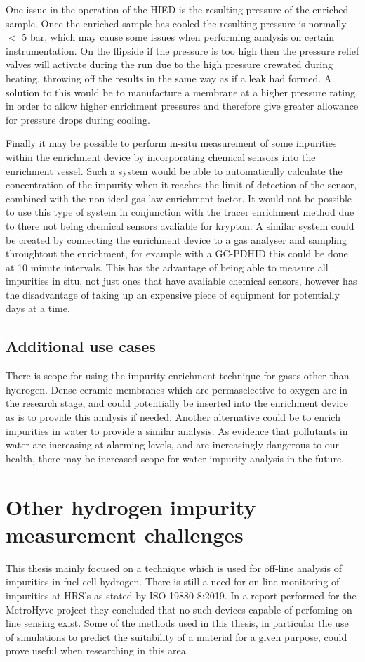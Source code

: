 One issue in the operation of the HIED is the resulting pressure of the enriched sample. Once the enriched sample has cooled the resulting pressure is normally $<$ 5 bar, which may cause some issues when performing analysis on certain instrumentation. On the flipside if the pressure is too high then the pressure relief valves will activate during the run due to the high pressure crewated during heating, throwing off the results in the same way as if a leak had formed. A solution to this would be to manufacture a membrane at a higher pressure rating in order to allow higher enrichment pressures and therefore give greater allowance for pressure drops during cooling. 

Finally it may be possible to perform in-situ measurement of some inpurities within the enrichment device by incorporating chemical sensors into the enrichment vessel. Such a system would be able to automatically calculate the concentration of the impurity when it reaches the limit of detection of the sensor, combined with the non-ideal gas law enrichment factor. It would not be possible to use this type of system in conjunction with the tracer enrichment method due to there not being chemical sensors avaliable for krypton. A similar system could be created by connecting the enrichment device to a gas analyser and sampling throughtout the enrichment, for example with a GC-PDHID this could be done at 10 minute intervals. This has the advantage of being able to measure all impurities in situ, not just ones that have avaliable chemical sensors, however has the disadvantage of taking up an expensive piece of equipment for potentially days at a time. 

\subsection{Additional use cases}
There is scope for using the impurity enrichment technique for gases other than hydrogen. Dense ceramic membranes which are permaselective to oxygen are in the research stage, \cite{LIU2005103} and could potentially be inserted into the enrichment device as is to provide this analysis if needed. Another alternative could be to enrich impurities in water to provide a similar analysis. As evidence that pollutants in water are increasing at alarming levels, and are increasingly dangerous to our health, there may be increased scope for water impurity analysis in the future. \cite{marketresearchfirm}

\section{Other hydrogen impurity measurement challenges}
This thesis mainly focused on a technique which is used for off-line analysis of impurities in fuel cell hydrogen. There is still a need for on-line monitoring of impurities at HRS's as stated by ISO 19880-8:2019. In a report performed for the MetroHyve project they concluded that no such devices capable of perfoming on-line sensing exist. Some of the methods used in this thesis, in particular the use of simulations to predict the suitability of a material for a given purpose, could prove useful when researching in this area. 

